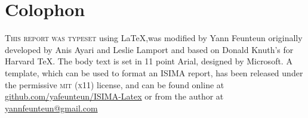 \chapter*{Colophon}

\begin{center}
\parbox{200pt}{\raggedright\lettrine[lines=3,slope=-2pt,nindent=-4pt]{\textcolor{ISIMA-Gold}{T}}{his report was typeset} using \LaTeX,was modified by Yann Feunteun originally developed by Anis Ayari and Leslie Lamport and based on Donald Knuth's for Harvard \TeX. The body text is set in 11 point Arial, designed by Microsoft. A template, which can be used to format an ISIMA report, has been released under the permissive \textsc{mit} (\textsc{x}11) license, and can be found online at \href{https://github.com/yafeunteun/ISIMA-Latex}{github.com/yafeunteun/ISIMA-Latex} or from the author at \href{mailto:yannfeunteun@gmail.com}{yannfeunteun@gmail.com}
}
\end{center}